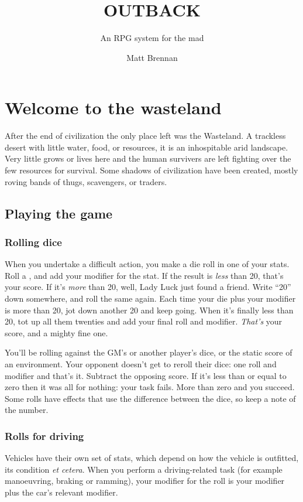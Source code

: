 \documentclass[10pt, a4paper, twocolumn]{book}
\title{\uppercase{Outback}}
\subtitle{An RPG system for the mad}
\author{Matt Brennan}
\date{}
\begin{document}
\frontmatter
\maketitle
\tableofcontents

\mainmatter
\chapter{Welcome to the wasteland}
After the end of civilization the only place left was the Wasteland. A trackless desert with little water, food, or resources, it is an inhospitable arid landscape. Very little grows or lives here and the human survivers are left fighting over the few resources for survival. Some shadows of civilization have been created, mostly roving bands of thugs, scavengers, or traders. 
\section{Playing the game}
\subsection{Rolling dice}
When you undertake a difficult action, you make a die roll in one of your stats.
Roll a , and add your modifier for the stat. If the result is
\emph{less} than 20, that's your score. If it's \emph{more} than 20, well, Lady
Luck just found a friend. Write ``20'' down somewhere, and roll the same again. Each
time your die plus your modifier is more than 20, jot down another 20 and keep going.
When it's finally less than 20, tot up all them twenties and add your final roll
and modifier. \emph{That's} your score, and a mighty fine one.

You'll be rolling against the GM's or another player's dice, or the static score
of an environment. Your opponent doesn't get to reroll their dice: one roll and
modifier and that's it. Subtract the opposing score. If it's less than or equal
to zero then it was all for nothing: your task fails. More than zero and you
succeed. Some rolls have effects that use the difference between the dice, so
keep a note of the number.

\subsection{Rolls for driving}
Vehicles have their own set of stats, which depend on how the vehicle is
outfitted, its condition \emph{et cetera}. When you perform a driving-related
task (for example manoeuvring, braking or ramming), your modifier for the roll
is your  modifier plus the car's relevant modifier.
\end{document}
